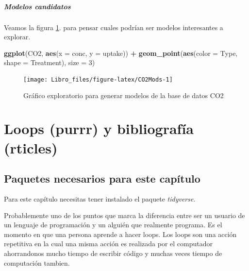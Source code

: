 \documentclass[]{book}
\newenvironment{Shaded}{\begin{snugshade}}{\end{snugshade}}
\newcommand{\DataTypeTok}[1]{\textcolor[rgb]{0.13,0.29,0.53}{#1}}
\newcommand{\DecValTok}[1]{\textcolor[rgb]{0.00,0.00,0.81}{#1}}
\newcommand{\KeywordTok}[1]{\textcolor[rgb]{0.13,0.29,0.53}{\textbf{#1}}}
\newcommand{\NormalTok}[1]{#1}
\newcommand{\OperatorTok}[1]{\textcolor[rgb]{0.81,0.36,0.00}{\textbf{#1}}}
\newcommand{\StringTok}[1]{\textcolor[rgb]{0.31,0.60,0.02}{#1}}
\let\oldparagraph\paragraph
\renewcommand{\paragraph}[1]{\oldparagraph{#1}\mbox{}}
\begin{document}
\hypertarget{modelos-candidatos}{%
\paragraph{Modelos candidatos}\label{modelos-candidatos}}

Veamos la figura \ref{fig:CO2Mods}. para pensar cuales podrían ser
modelos interesantes a explorar.

\begin{Shaded}
\begin{Highlighting}[]
\KeywordTok{ggplot}\NormalTok{(CO2, }\KeywordTok{aes}\NormalTok{(}\DataTypeTok{x =}\NormalTok{ conc, }\DataTypeTok{y =}\NormalTok{ uptake)) }\OperatorTok{+}\StringTok{ }\KeywordTok{geom_point}\NormalTok{(}\KeywordTok{aes}\NormalTok{(}\DataTypeTok{color =}\NormalTok{ Type, }
    \DataTypeTok{shape =}\NormalTok{ Treatment), }\DataTypeTok{size =} \DecValTok{3}\NormalTok{)}
\end{Highlighting}
\end{Shaded}

\begin{figure}

{\centering \texttt{[image: Libro\_files/figure-latex/CO2Mods-1]} 

}

\caption{Gráfico exploratorio para generar modelos de la base de datos CO2}\label{fig:CO2Mods}
\end{figure}

\hypertarget{loops}{%
\chapter{Loops (purrr) y bibliografía (rticles)}\label{loops}}

\hypertarget{paquetes-necesarios-para-este-capitulo-5}{%
\section{Paquetes necesarios para este
capítulo}\label{paquetes-necesarios-para-este-capitulo-5}}

Para este capítulo necesitas tener instalado el paquete
\emph{tidyverse}.

Probablemente uno de los puntos que marca la diferencia entre ser un
usuario de un lenguaje de programación y un alguién que realmente
programa. Es el momento en que una persona aprende a hacer loops. Los
loops son una acción repetitiva en la cual una misma acción es realizada
por el computador ahorrandonos mucho tiempo de escribir código y muchas
veces tiempo de computación tambien.
\end{document}
